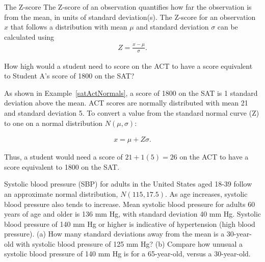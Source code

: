 \begin{onebox}{The Z-score}
The Z-score of an observation quantifies how far the observation is from the mean, in units of standard deviation(s). The Z-score for an observation $x$ that follows a distribution with mean $\mu$ and standard deviation $\sigma$ can be calculated using
\begin{align*}
Z = \frac{x-\mu}{\sigma}.
\end{align*}
\end{onebox}

\textD{\newpage}

\begin{examplewrap}
\begin{nexample}{How high would a student need to score on the ACT to have a score equivalent to Student A's score of 1800 on the SAT?} 

As shown in Example~\ref{satActNormals}, a score of 1800 on the SAT is 1 standard deviation above the mean. ACT scores are normally distributed with mean 21 and standard deviation 5. To convert a value from the standard normal curve (Z) to one on a normal distribution $N(\mu, \sigma)$:

\begin{align*}
x = \mu + Z\sigma.
\end{align*}

Thus, a student would need a score of $21 + 1(5) = 26$ on the ACT to have a score equivalent to 1800 on the SAT. 
\end{nexample}
\end{examplewrap}

\begin{exercisewrap}
\begin{nexercise}\label{nhanes_bp}%
Systolic blood pressure (SBP) for adults in the United States aged 18-39 follow an approximate normal distribution, $N(115, 17.5)$. As age increases, systolic blood pressure also tends to increase. Mean systolic blood pressure for adults 60 years of age and older is 136 mm Hg, with standard deviation 40 mm Hg. Systolic blood pressure of 140 mm Hg or higher is indicative of hypertension (high blood pressure). 
(a) How many standard deviations away from the mean is a 30-year-old with systolic blood pressure of 125 mm Hg? (b) Compare how unusual a systolic blood pressure of 140 mm Hg is for a 65-year-old, versus a 30-year-old.\footnotemark{}
\end{nexercise}
\end{exercisewrap}

